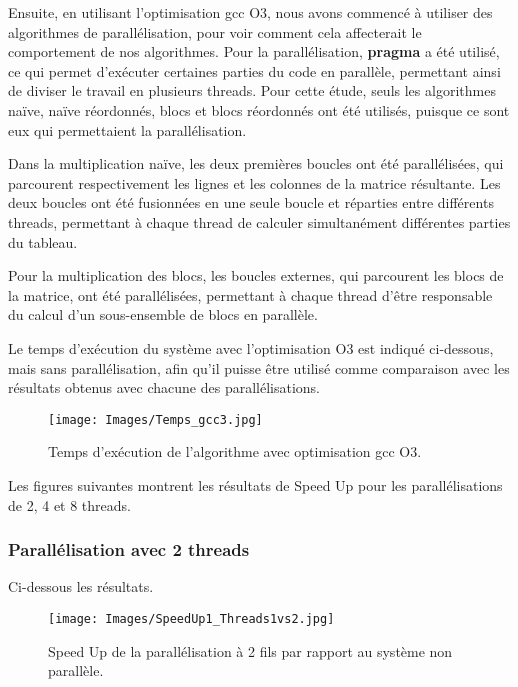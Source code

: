 \documentclass[../CSC_5RO06_TA.tex]{subfiles}
\begin{document}
Ensuite, en utilisant l'optimisation gcc O3, nous avons commencé à utiliser des algorithmes de parallélisation, pour voir comment cela affecterait le comportement de nos algorithmes. Pour la parallélisation, \textbf{pragma} a été utilisé, ce qui permet d'exécuter certaines parties du code en parallèle, permettant ainsi de diviser le travail en plusieurs threads. Pour cette étude, seuls les algorithmes naïve, naïve réordonnés, blocs et blocs réordonnés ont été utilisés, puisque ce sont eux qui permettaient la parallélisation.

Dans la multiplication naïve, les deux premières boucles ont été parallélisées, qui parcourent respectivement les lignes et les colonnes de la matrice résultante. Les deux boucles ont été fusionnées en une seule boucle et réparties entre différents threads, permettant à chaque thread de calculer simultanément différentes parties du tableau.

Pour la multiplication des blocs, les boucles externes, qui parcourent les blocs de la matrice, ont été parallélisées, permettant à chaque thread d'être responsable du calcul d'un sous-ensemble de blocs en parallèle.

Le temps d'exécution du système avec l'optimisation O3 est indiqué ci-dessous, mais sans parallélisation, afin qu'il puisse être utilisé comme comparaison avec les résultats obtenus avec chacune des parallélisations.


\begin{figure}[H]
    \centering
    \texttt{[image: Images/Temps\_gcc3.jpg]}
    \caption{Temps d'exécution de l'algorithme avec optimisation gcc O3.}
    \label{fig:5}
\end{figure}


Les figures suivantes montrent les résultats de Speed Up pour les parallélisations de 2, 4 et 8 threads.


\subsubsection{Parallélisation avec 2 threads}

Ci-dessous les résultats.

\begin{figure}[H]
    \centering
    \texttt{[image: Images/SpeedUp1\_Threads1vs2.jpg]}
    \caption{Speed Up de la parallélisation à 2 fils par rapport au système non parallèle.}
    \label{fig:6}
\end{figure}
\end{document}

